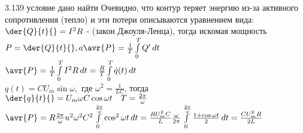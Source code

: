 \testCom
{%
	3.139
}
{%
	условие
}
{%
	дано
}
{%
	найти
}
{%
	Очевидно, что контур теряет энергию из-за активного сопротивления (тепло) и эти потери описываются уравнением вида:\\
	$\der{Q}{t}{} = I^2 R$ - (закон Джоуля-Ленца), тогда искомая мощность $P = \der{Q}{t}{}, a \avr{P} = \frac{1}{T} \int\limits_0^T Q' \, dt$\\
	$\avr{P} = \frac{1}{T} \int\limits_0^T I^2 R \, dt = \frac{R}{T} \int\limits_0^T \dot q(t)\, dt$\\
	$q(t) = C U_m \sin \omega,$ где $\omega^2 = \frac{1}{LC}$, тогда\\
	$\der{q}{t}{} =U_m \omega C \cos \omega t \quad T = \frac{2 \pi}{\omega}$\\
	$\avr{P} = R \frac{2 \pi}{\omega} u^2 \omega^2 C^2 \int\limits_0^{\frac{2 \pi}{\omega}} \cos^2 \omega t \, dt = \frac{R U_m^2 C}{L} \frac{\omega}{2 \pi} \int\limits_0^{\frac{2 \pi}{\omega}} \frac{1 + \cos \omega t}{2} \, dt = \frac{C U_m^2 R}{2L}$\\	
}

